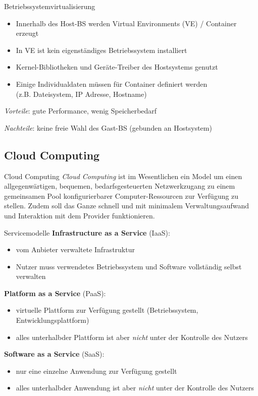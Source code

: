 \begin{defi}{Betriebssystemvirtualisierung}
    \begin{itemize}
        \item Innerhalb des Host-BS werden Virtual Environments (VE) / Container erzeugt
        \item In VE ist kein eigenständiges Betriebssystem installiert
        \item Kernel-Bibliotheken und Geräte-Treiber des Hostsystems genutzt
        \item Einige Individualdaten müssen für Container definiert werden \\ (z.B. Dateisystem, IP Adresse, Hostname)
    \end{itemize}

    \emph{Vorteile}: gute Performance, wenig Speicherbedarf

    \emph{Nachteile}: keine freie Wahl des Gast-BS (gebunden an Hostsystem)
\end{defi}

\subsection{Cloud Computing}

\begin{defi}{Cloud Computing}
    \emph{Cloud Computing} ist im Wesentlichen ein Model um einen allgegenwärtigen,
    bequemen, bedarfsgesteuerten Netzwerkzugang zu einem gemeinsamen Pool konfigurierbarer
    Computer-Ressourcen zur Verfügung zu stellen. Zudem soll das Ganze
    schnell und mit minimalem Verwaltungsaufwand und Interaktion mit dem Provider
    funktionieren.
\end{defi}

\begin{defi}{Servicemodelle}
    \textbf{Infrastructure as a Service} (IaaS):
    \begin{itemize}
        \item vom Anbieter verwaltete Infrastruktur
        \item Nutzer muss verwendetes Betriebssystem und Software vollständig selbst verwalten
    \end{itemize}

    \textbf{Platform as a Service} (PaaS):
    \begin{itemize}
        \item virtuelle Plattform zur Verfügung gestellt (Betriebssystem, Entwicklungsplattform)
        \item alles \glqq unterhalb\grqq der Plattform ist aber \emph{nicht} unter der Kontrolle des Nutzers
    \end{itemize}

    \textbf{Software as a Service} (SaaS):
    \begin{itemize}
        \item nur eine einzelne Anwendung zur Verfügung gestellt
        \item alles \glqq unterhalb\grqq der Anwendung ist aber \emph{nicht} unter der Kontrolle des Nutzers
    \end{itemize}
\end{defi}

